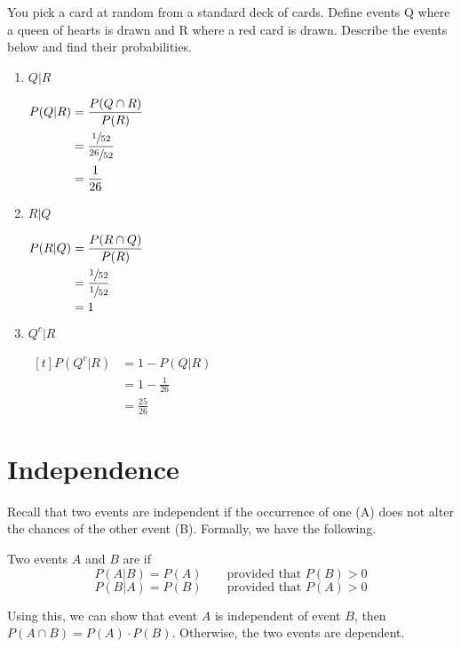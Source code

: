 \begin{example}
    You pick a card at random from a standard deck of cards. Define events Q where a queen of hearts is drawn and R where a red card is drawn. Describe the events below and find their probabilities.

    \begin{enumerate}[label=\alph*)]
        \item $Q | R$
        
        $\begin{aligned}[t]
            P(Q | R) & = \frac{P(Q \cap R)}{P(R)}             \\
                     & = \frac{\sfrac{1}{52}}{\sfrac{26}{52}} \\
                     & = \frac{1}{26}
        \end{aligned}$

        \item $R | Q$

        $\begin{aligned}[t]
            P(R | Q) & = \frac{P(R \cap Q)}{P(R)}            \\
                     & = \frac{\sfrac{1}{52}}{\sfrac{1}{52}} \\
                     & = 1
        \end{aligned}$

        \item $Q^c | R$ 
        
        $\begin{aligned}[t]
            P(Q^c | R) & = 1 - P(Q | R)     \\
                       & = 1 - \frac{1}{26} \\ 
                       & = \frac{25}{26}
        \end{aligned}$
    \end{enumerate}
\end{example}

\section{Independence}

Recall that two events are independent if the occurrence of one (A) does not alter the chances of the other event (B). Formally, we have the following.

\begin{definition}
    Two events $A$ and $B$ are  if 
    $$P(A | B) = P(A) \qquad \text{provided that } P(B) > 0$$
    $$P(B | A) = P(B) \qquad \text{provided that } P(A) > 0$$

    Using this, we can show that event $A$ is independent of event $B$, then $P(A \cap B) = P(A) \cdot P(B)$. Otherwise, the two events are dependent. 
\end{definition}

